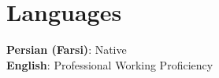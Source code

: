 \section{Languages}
\begin{itemize}[leftmargin=0.15in, label={}]
	\small{\item{
			\textbf{Persian (Farsi)}{: Native} \\
			\textbf{English}{: Professional Working Proficiency }
	}}
\end{itemize}
\vspace{-16pt}


